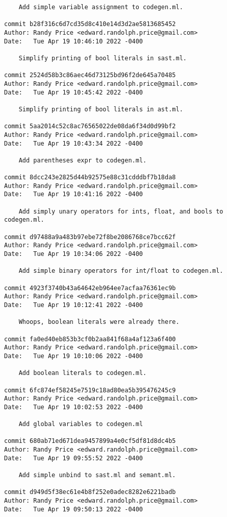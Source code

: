 {\begin{verbatim}
    Add simple variable assignment to codegen.ml.

commit b28f316c6d7cd35d8c410e14d3d2ae5813685452
Author: Randy Price <edward.randolph.price@gmail.com>
Date:   Tue Apr 19 10:46:10 2022 -0400

    Simplify printing of bool literals in sast.ml.

commit 2524d58b3c86aec46d73125bd96f2de645a70485
Author: Randy Price <edward.randolph.price@gmail.com>
Date:   Tue Apr 19 10:45:42 2022 -0400

    Simplify printing of bool literals in ast.ml.

commit 5aa2014c52c8ac76565022de08da6f34d0d99bf2
Author: Randy Price <edward.randolph.price@gmail.com>
Date:   Tue Apr 19 10:43:34 2022 -0400

    Add parentheses expr to codegen.ml.

commit 8dcc243e2825d44b92575e88c31cdddbf7b18da8
Author: Randy Price <edward.randolph.price@gmail.com>
Date:   Tue Apr 19 10:41:16 2022 -0400

    Add simply unary operators for ints, float, and bools to codegen.ml.

commit d97488a9a483b97ebe72f8be2086768ce7bcc62f
Author: Randy Price <edward.randolph.price@gmail.com>
Date:   Tue Apr 19 10:34:06 2022 -0400

    Add simple binary operators for int/float to codegen.ml.

commit 4923f3740b43a64642eb964ee7acfaa76361ec9b
Author: Randy Price <edward.randolph.price@gmail.com>
Date:   Tue Apr 19 10:12:41 2022 -0400

    Whoops, boolean literals were already there.

commit fa0ed40eb853b3cf0b2aa841f68a4af123a6f400
Author: Randy Price <edward.randolph.price@gmail.com>
Date:   Tue Apr 19 10:10:06 2022 -0400

    Add boolean literals to codegen.ml.

commit 6fc874ef58245e7519c18ad80ea5b395476245c9
Author: Randy Price <edward.randolph.price@gmail.com>
Date:   Tue Apr 19 10:02:53 2022 -0400

    Add global variables to codegen.ml

commit 680ab71ed671dea9457899a4e0cf5df81d8dc4b5
Author: Randy Price <edward.randolph.price@gmail.com>
Date:   Tue Apr 19 09:55:52 2022 -0400

    Add simple unbind to sast.ml and semant.ml.

commit d949d5f38ec61e4b8f252e0adec8282e6221badb
Author: Randy Price <edward.randolph.price@gmail.com>
Date:   Tue Apr 19 09:50:13 2022 -0400


\end{verbatim}}
